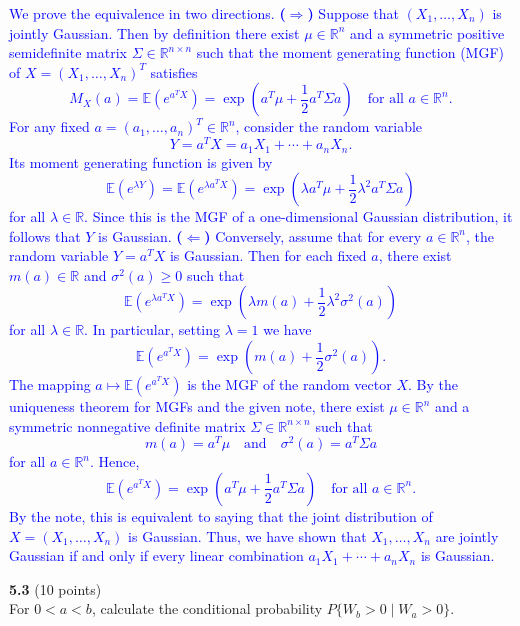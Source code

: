 \documentclass{article}
\begin{document}
\textcolor{blue}{We prove the equivalence in two directions.
\textbf{($\Rightarrow$)} Suppose that $(X_1,\dots,X_n)$ is jointly Gaussian. Then by definition there exist $\mu\in\mathbb{R}^n$ and a symmetric positive semidefinite matrix $\Sigma\in\mathbb{R}^{n\times n}$ such that the moment generating function (MGF) of $X=(X_1,\dots,X_n)^T$ satisfies
\[
M_X(a)=\mathbb{E}\left(e^{a^T X}\right)=\exp\left(a^T\mu+\frac{1}{2}a^T\Sigma a\right) \quad\text{for all } a\in\mathbb{R}^n.
\]
For any fixed $a=(a_1,\dots,a_n)^T\in\mathbb{R}^n$, consider the random variable
\[
Y=a^T X=a_1X_1+\cdots+a_nX_n.
\]
Its moment generating function is given by
\[
\mathbb{E}\left(e^{\lambda Y}\right)=\mathbb{E}\left(e^{\lambda a^T X}\right)=\exp\left(\lambda a^T\mu+\frac{1}{2}\lambda^2 a^T\Sigma a\right)
\]
for all $\lambda\in\mathbb{R}$. Since this is the MGF of a one-dimensional Gaussian distribution, it follows that $Y$ is Gaussian.
\textbf{($\Leftarrow$)} Conversely, assume that for every $a\in\mathbb{R}^n$, the random variable $Y=a^T X$ is Gaussian. Then for each fixed $a$, there exist $m(a)\in\mathbb{R}$ and $\sigma^2(a)\ge0$ such that
\[
\mathbb{E}\left(e^{\lambda a^T X}\right)=\exp\left(\lambda m(a)+\frac{1}{2}\lambda^2\sigma^2(a)\right)
\]
for all $\lambda\in\mathbb{R}$. In particular, setting $\lambda=1$ we have
\[
\mathbb{E}\left(e^{a^T X}\right)=\exp\left(m(a)+\frac{1}{2}\sigma^2(a)\right).
\]
The mapping $a\mapsto \mathbb{E}\left(e^{a^T X}\right)$ is the MGF of the random vector $X$. By the uniqueness theorem for MGFs and the given note, there exist $\mu\in\mathbb{R}^n$ and a symmetric nonnegative definite matrix $\Sigma\in\mathbb{R}^{n\times n}$ such that
\[
m(a)=a^T\mu\quad \text{and}\quad \sigma^2(a)=a^T\Sigma a
\]
for all $a\in\mathbb{R}^n$. Hence,
\[
\mathbb{E}\left(e^{a^T X}\right)=\exp\left(a^T\mu+\frac{1}{2}a^T\Sigma a\right) \quad\text{for all } a\in\mathbb{R}^n.
\]
By the note, this is equivalent to saying that the joint distribution of $X=(X_1,\dots,X_n)$ is Gaussian.
Thus, we have shown that $X_1,\dots,X_n$ are jointly Gaussian if and only if every linear combination $a_1X_1+\cdots+a_nX_n$ is Gaussian.
}



\noindent \textbf{5.3} (10 points) \\ For $0 < a < b$, calculate the conditional
probability $P\{W_b > 0 \mid W_a > 0\}$. 

\end{document}
